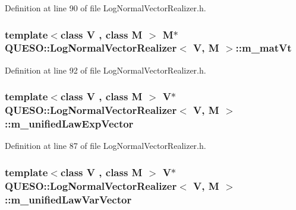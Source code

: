 Definition at line 90 of file Log\-Normal\-Vector\-Realizer.\-h.

\hypertarget{class_q_u_e_s_o_1_1_log_normal_vector_realizer_a7fcafdfed9d2ec7cc70b87109240754a}{
\subsubsection[{m\-\_\-mat\-Vt}]{\setlength{\rightskip}{0pt plus 5cm}template$<$class V , class M $>$ M$\ast$ {\bf Q\-U\-E\-S\-O\-::\-Log\-Normal\-Vector\-Realizer}$<$ V, M $>$\-::m\-\_\-mat\-Vt\hspace{0.3cm}{\ttfamily [private]}}}\label{class_q_u_e_s_o_1_1_log_normal_vector_realizer_a7fcafdfed9d2ec7cc70b87109240754a}


Definition at line 92 of file Log\-Normal\-Vector\-Realizer.\-h.

\hypertarget{class_q_u_e_s_o_1_1_log_normal_vector_realizer_a896a336c4baf517add5ba372e5120408}{
\subsubsection[{m\-\_\-unified\-Law\-Exp\-Vector}]{\setlength{\rightskip}{0pt plus 5cm}template$<$class V , class M $>$ V$\ast$ {\bf Q\-U\-E\-S\-O\-::\-Log\-Normal\-Vector\-Realizer}$<$ V, M $>$\-::m\-\_\-unified\-Law\-Exp\-Vector\hspace{0.3cm}{\ttfamily [private]}}}\label{class_q_u_e_s_o_1_1_log_normal_vector_realizer_a896a336c4baf517add5ba372e5120408}


Definition at line 87 of file Log\-Normal\-Vector\-Realizer.\-h.

\hypertarget{class_q_u_e_s_o_1_1_log_normal_vector_realizer_a418dbfe867eb80b53ebe3aeaf26d208c}{
\subsubsection[{m\-\_\-unified\-Law\-Var\-Vector}]{\setlength{\rightskip}{0pt plus 5cm}template$<$class V , class M $>$ V$\ast$ {\bf Q\-U\-E\-S\-O\-::\-Log\-Normal\-Vector\-Realizer}$<$ V, M $>$\-::m\-\_\-unified\-Law\-Var\-Vector\hspace{0.3cm}{\ttfamily [private]}}}\label{class_q_u_e_s_o_1_1_log_normal_vector_realizer_a418dbfe867eb80b53ebe3aeaf26d208c}


